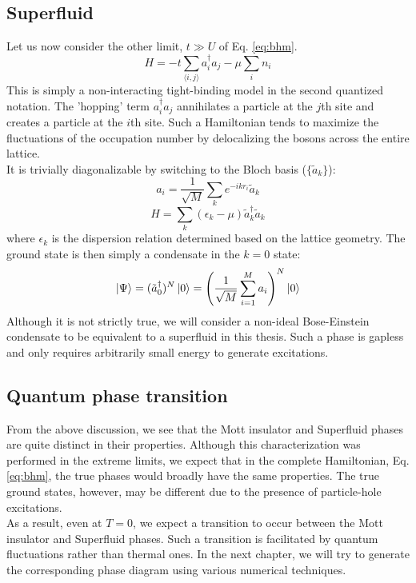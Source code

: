 \subsection{Superfluid}
Let us now consider the other limit, $t \gg U$ of Eq. \eqref{eq:bhm}. 
\begin{equation}
    H = -t\sum_{\langle i, j \rangle} a_i^{\dagger}a_j - \mu \sum_i n_i
\end{equation}
This is simply a non-interacting tight-binding model in the second quantized notation. The 'hopping' term $a_i^{\dagger}a_j$ annihilates a particle at the $j$th site and creates a particle at the $i$th site. Such a Hamiltonian tends to maximize the fluctuations of the occupation number by delocalizing the bosons across the entire lattice.
\vspace{0.5cm}\\
It is trivially diagonalizable by switching to the Bloch basis ($\{\tilde{a}_k\}$):
\begin{equation}
    a_i = \frac{1}{\sqrt{M}}\sum_k e^{-ikr_i} \tilde{a}_k
\end{equation}
\begin{equation}
    H = \sum_k (\epsilon_k - \mu) \tilde{a}_k^{\dagger}\tilde{a}_k
\end{equation}
where $\epsilon_k$ is the dispersion relation determined based on the lattice geometry. The ground state is then simply a condensate in the $k=0$ state:
\begin{equation}
    \ket{\Psi} = (\tilde{a}_0^{\dagger})^N \ket{0} = \left (\frac{1}{\sqrt{M}}\sum_{i = 1}^M a_i \right )^N \ket{0}
\end{equation}
Although it is not strictly true\cite{schmets2008teaching}, we will consider a non-ideal Bose-Einstein condensate to be equivalent to a superfluid in this thesis. Such a phase is gapless and only requires arbitrarily small energy to generate excitations\cite{Bloch_2008}.

\subsection{Quantum phase transition}
From the above discussion, we see that the Mott insulator and Superfluid phases are quite distinct in their properties. Although this characterization was performed in the extreme limits, we expect that in the complete Hamiltonian, Eq. \eqref{eq:bhm}, the true phases would broadly have the same properties. The true ground states, however, may be different due to the presence of particle-hole excitations.
\vspace{0.5cm}\\
As a result, even at $T=0$, we expect a transition to occur between the Mott insulator and Superfluid phases. Such a transition is facilitated by quantum fluctuations rather than thermal ones. In the next chapter, we will try to generate the corresponding phase diagram using various numerical techniques.

